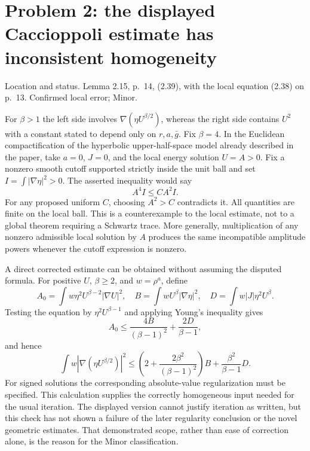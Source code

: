 \documentclass[10pt]{article}
\begin{document}
\section*{Problem 2: the displayed Caccioppoli estimate has inconsistent homogeneity}
Location and status. Lemma 2.15, p. 14, (2.39), with the local equation (2.38) on p. 13. Confirmed local error; Minor.\par
For \(\beta>1\) the left side involves \(\nabla(\eta U^{\beta/2})\), whereas the right side contains \(U^2\) with a constant stated to depend only on \(r,a,\bar g\). Fix \(\beta=4\). In the Euclidean compactification of the hyperbolic upper-half-space model already described in the paper, take \(a=0\), \(J=0\), and the local energy solution \(U=A>0\). Fix a nonzero smooth cutoff supported strictly inside the unit ball and set \(I=\int|\nabla\eta|^2>0\). The asserted inequality would say \[A^4 I\leq C A^2 I.\] For any proposed uniform \(C\), choosing \(A^2>C\) contradicts it. All quantities are finite on the local ball. This is a counterexample to the local estimate, not to a global theorem requiring a Schwartz trace. More generally, multiplication of any nonzero admissible local solution by \(A\) produces the same incompatible amplitude powers whenever the cutoff expression is nonzero.\par
A direct corrected estimate can be obtained without assuming the disputed formula. For positive \(U\), \(\beta\geq2\), and \(w=\rho^a\), define \[A_0=\int w\eta^2 U^{\beta-2}|\nabla U|^2,\quad
 B=\int wU^\beta|\nabla\eta|^2,\quad
 D=\int w|J|\eta^2U^\beta.\] Testing the equation by \(\eta^2U^{\beta-1}\) and applying Young’s inequality gives \[A_0\leq\frac{4B}{(\beta-1)^2}+\frac{2D}{\beta-1},\] and hence \[\int w|\nabla(\eta U^{\beta/2})|^2
 \leq\left(2+\frac{2\beta^2}{(\beta-1)^2}\right)B
       +\frac{\beta^2}{\beta-1}D.\] For signed solutions the corresponding absolute-value regularization must be specified. This calculation supplies the correctly homogeneous input needed for the usual iteration. The displayed version cannot justify iteration as written, but this check has not shown a failure of the later regularity conclusion or the novel geometric estimates. That demonstrated scope, rather than ease of correction alone, is the reason for the Minor classification.\par
\end{document}
